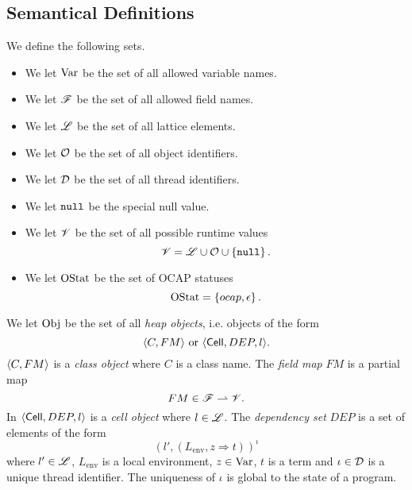 \subsection{Semantical Definitions}%
\label{sub:semantical_definitions}

\begin{definition}[Sets] We define the following sets.
  \begin{itemize}
    \item We let $\mathrm{Var}$ be the set of all allowed variable names.
    \item We let $\mathscr{F}$ be the set of all allowed field names.
    \item We let $\mbox{$\mathscr{L}$}$ be the set of all lattice elements.
    \item We let $\mathcal{O}$ be the set of all object identifiers.
    \item We let $\mathcal{D}$ be the set of all thread identifiers.
    \item We let $\mbox{\mdseries\texttt{null}}$ be the special null value.
    \item We let $\mathscr{V}$ be the set of all possible runtime values
      \begin{equation*}
        \mathscr{V} = \mbox{$\mathscr{L}$} \cup \mathcal{O} \cup \left\{ \mbox{\mdseries\texttt{null}} \right\}.
      \end{equation*}
    \item We let $\mathrm{OStat}$ be the set of OCAP statuses
      \begin{equation*}
        \mathrm{OStat} = \left\{ \mbox{$ocap$}, \mbox{$\epsilon$} \right\}.
      \end{equation*}
  \end{itemize}
\end{definition}

\begin{definition}\label{def:heap_obj}
  We let $\mathrm{Obj}$ be the set of all \emph{heap objects}, i.e. objects of the
  form
  \begin{equation*}
    \mbox{$\langle C, FM \rangle$} \text{ or } \mbox{$\langle \mbox{$\mathsf{Cell}$}{}, DEP, l \rangle$}.
  \end{equation*}
  $\mbox{$\langle C, FM \rangle$}$ is a \emph{class object} where $C$ is a class name. The \emph{field
  map} $FM$ is a partial map
  \begin{equation*}
    FM \in \mathscr{F} \rightharpoonup \mathscr{V}.
  \end{equation*}
  In $\mbox{$\langle \mbox{$\mathsf{Cell}$}{}, DEP, l \rangle$}$ is a \emph{cell object} where $l \in \mbox{$\mathscr{L}$}$. The
  \emph{dependency set} $DEP$ is a set of elements of the form
  \begin{equation*}
    (l' , (L_{\text{env}}, z \Rightarrow t))^\iota
  \end{equation*}
  where $l' \in \mbox{$\mathscr{L}$}$, $L_{\text{env}}$ is a local environment, $z \in
  \mathrm{Var}$, $t$ is a term and $\iota \in \mathcal{D}$ is a unique thread identifier. The
  uniqueness of $\iota$ is global to the state of a program.
\end{definition}

